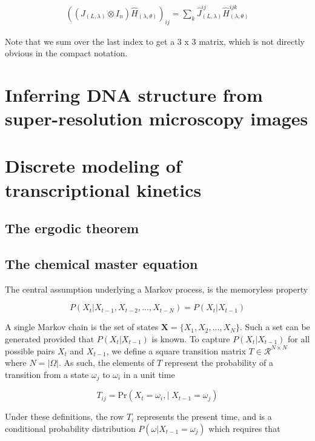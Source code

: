 \documentclass{ucetd}
\begin{document}
\begin{align*}
((J_{(L,\lambda)}\otimes I_{n})\hat{H}_{(\lambda,\theta)})_{ij} = \sum_{k}\hat{J}_{(L,\lambda)}^{ij}\hat{H}_{(\lambda,\theta)}^{ijk}
\end{align*}

Note that we sum over the last index to get a 3 x 3 matrix, which is not directly obvious in the compact notation.


\chapter{Inferring DNA structure from super-resolution microscopy images}

\chapter{Discrete modeling of transcriptional kinetics}

\section{The ergodic theorem}

\section{The chemical master equation}

The central assumption underlying a Markov process, is the memoryless property

\begin{equation*}
P(X_{t}|X_{t-1}, X_{t-2}, ..., X_{t-N}) = P(X_{t}|X_{t-1})
\end{equation*}

A single Markov chain is the set of states $\bm{X} = \{X_{1},X_{2},...,X_{N}\}$. Such a set can be generated provided that $P(X_{t}|X_{t-1})$ is known. To capture $P(X_{t}|X_{t-1})$ for all possible pairs $X_{t}$ and $X_{t-1}$, we define a square transition matrix $T\in \mathcal{R}^{N\times N}$ where $N = |\Omega|$. As such, the elements of $T$ represent the probability of a transition from a state $\omega_{j}$ to $\omega_{i}$ in a unit time

\begin{equation*}
T_{ij} = \mathrm{Pr}\left(X_{t}=\omega_{i}, | \;X_{t-1}=\omega_{j}\right)
\end{equation*}

Under these definitions, the row $T_{i}$ represents the present time, and is a conditional  probability distribution $P(\omega | X_{t-1} = \omega_{j})$ which requires that
\end{document}
